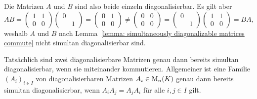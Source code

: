Die Matrizen $A$ und $B$ sind also beide einzeln diagonalisierbar.
Es gilt aber
\[
        A B
  =     \begin{pmatrix}
          1 & 1
          \\
          0 & 0
        \end{pmatrix}
        \begin{pmatrix}
          0 & 
          \\
            & 1
        \end{pmatrix}
  =     \begin{pmatrix}
          0 & 1
          \\
          0 & 0
        \end{pmatrix}
  \neq  \begin{pmatrix}
          0 & 0
          \\
          0 & 0
        \end{pmatrix}
  =     \begin{pmatrix}
          0 & 
          \\
            & 1
        \end{pmatrix}
        \begin{pmatrix}
          1 & 1
          \\
          0 & 0
        \end{pmatrix}
  =     B A,
\]
weshalb $A$ und $B$ nach Lemma~\ref{lemma: simultaneously diagonalizable matrices commute} nicht simultan diagonalisierbar sind.

\begin{remark}
  Tatsächlich sind zwei diagonalisierbare Matrizen genau dann bereits simultan diagonalisierbar, wenn sie miteinander kommutieren.
  Allgemeiner ist eine Familie $(A_i)_{i \in I}$ von diagonalisierbaren Matrizen $A_i \in \operatorname{M}_{n}(K)$ genau dann bereits simultan diagonalisierbar, wenn $A_i A_j = A_j A_i$ für alle $i,j \in I$ gilt.
\end{remark}





\subsection{}

